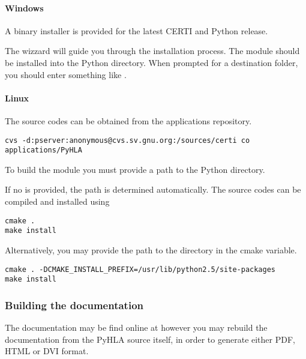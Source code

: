 \documentclass[12pt,a4paper]{howto}
\begin{document}
\paragraph{Windows}

A binary installer is provided for the latest CERTI and Python release.

The wizzard will guide you through the installation process. The 
module should be installed into the Python  directory.
When prompted for a destination folder, you should enter something like
.

\paragraph{Linux}

The  source codes can be obtained from the 
applications repository.
\begin{verbatim}
cvs -d:pserver:anonymous@cvs.sv.gnu.org:/sources/certi co applications/PyHLA
\end{verbatim}

To build the  module you must provide a path to the Python
 directory.

If no  is provided, the path is determined
automatically. The source codes can be compiled and installed using
\begin{verbatim}
cmake .
make install
\end{verbatim}

Alternatively, you may provide the path to the  directory
in the  cmake variable.
\begin{verbatim}
cmake . -DCMAKE_INSTALL_PREFIX=/usr/lib/python2.5/site-packages
make install
\end{verbatim}

\subsubsection{Building the documentation}
The  documentation may be find online at
however you may rebuild the documentation from the PyHLA source itself, in order
to generate either PDF, HTML or DVI format.
\end{document}
